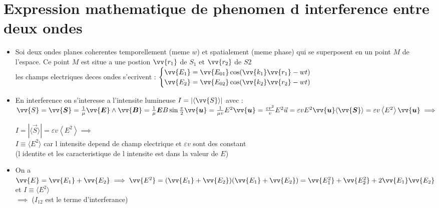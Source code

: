 \documentclass[12pt]{book}
\begin{document}
        \section{Expression mathematique de phenomen d interference entre deux ondes}
            \begin{itemize}
                \item Soi deux ondes planes coherentes temporellement (meme $w$) et spatialement (meme phase) qui se superposent en un point $M$ de l'espace. Ce point $M$ est situe a une postion $ \vv{r_1}$ de $S_1$ et $\vv{r_2}$ de $S2$ \\
                    les champs electriques deces ondes s'ecrivent : $\begin{cases}
                        \vv{E_1} = \vv{E_{01}}\cos(\vv{k_1}\vv{r_1}-wt)\\
                        \vv{E_2} = \vv{E_{02}}\cos(\vv{k_2}\vv{r_2}-wt)
                    \end{cases}$  \\
                \item En interference on s'interesse a l'intensite lumineuse $I = | \langle \vv{S}\rangle |$ avec :
                    $\vv{S} =\vv{\boldsymbol{S}}=\frac{1}{\mu} \vv{\boldsymbol{E}} \wedge \vv{\boldsymbol{B}}=\frac{1}{\mu} \boldsymbol{E} B \sin \frac{\pi}{2} \vv{\boldsymbol{u}}=\frac{1}{\mu v} E^{2} \vv{\boldsymbol{u}}=\frac{\varepsilon v^{2}}{v} E^{2} \vec{u}=\varepsilon v E^{2} \vv{\boldsymbol{u}}\langle\vv{\boldsymbol{S}}\rangle=\varepsilon v\left\langle E^{2}\right\rangle \vv{\boldsymbol{u}} \implies$
                    \begin{center}
                        $I=|\langle\vec{S}\rangle|=\varepsilon v\left\langle E^{2}\right\rangle \implies$ \\
                        $ I \equiv \langle E^2 \rangle$ car l intensite depend de champ electrique et $\varepsilon v$ sont des constant \\ (l identite et les caracteristique de l intensite est dans la valeur de $E$)  
                    \end{center} 
                \item On a $\vv{E} =\vv{E_1} + \vv{E_2} \implies \vv{E^2}=(\vv{E_1}+\vv{E_2})(\vv{E_1}+\vv{E_2})=\vv{E_1^2}+\vv{E_2^2}+2\vv{E_1}\vv{E_2}$\\
                    et $ I \equiv \langle E^2 \rangle$ \\
                     $\implies $ ($I_{12}$ est le terme d'interferance)

\end{itemize}
\end{document}
